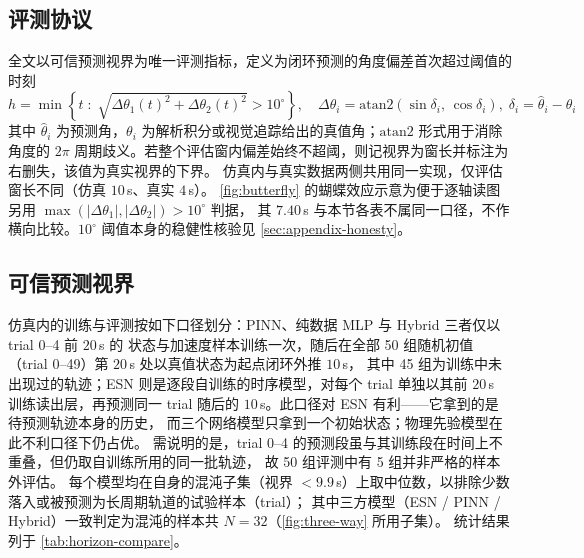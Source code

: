 \documentclass[a4paper,12pt]{ctexart}   %
\newcommand{\thetaone}{\theta_1}
\newcommand{\thetatwo}{\theta_2}
\renewcommand{\emph}[1]{#1}
\begin{document}
\subsection{评测协议}
\label{sec:results-protocol}
全文以\emph{可信预测视界}为唯一评测指标，定义为闭环预测的角度偏差首次超过阈值的时刻
\begin{equation}
h = \min\left\{ t \;:\; \sqrt{\Delta\thetaone(t)^2 + \Delta\thetatwo(t)^2} > 10^\circ \right\},
\quad
\Delta\theta_i = \mathrm{atan2}\!\left(\sin\delta_i,\, \cos\delta_i\right),\;
\delta_i = \hat\theta_i - \theta_i
\label{eq:horizon}
\end{equation}
其中 $\hat\theta_i$ 为预测角，$\theta_i$ 为解析积分或视觉追踪给出的真值角；$\mathrm{atan2}$ 形式用于消除角度的
$2\pi$ 周期歧义。若整个评估窗内偏差始终不超阈，则记视界为窗长并标注为\emph{右删失}，该值为真实视界的下界。
仿真内与真实数据两侧共用同一实现，仅评估窗长不同（仿真 $10$\,s、真实 $4$\,s）。
\cref{fig:butterfly} 的蝴蝶效应示意为便于逐轴读图另用 $\max(|\Delta\thetaone|, |\Delta\thetatwo|) > 10^\circ$ 判据，
其 $7.40$\,s 与本节各表不属同一口径，不作横向比较。$10^\circ$ 阈值本身的稳健性核验见 \cref{sec:appendix-honesty}。

\subsection{可信预测视界}
\label{sec:results-horizon}

仿真内的训练与评测按如下口径划分：PINN、纯数据 MLP 与 Hybrid 三者仅以 trial 0--4 前 $20$\,s 的
状态与加速度样本训练一次，随后在全部 50 组随机初值（trial 0--49）第 $20$\,s 处以真值状态为起点闭环外推 $10$\,s，
其中 45 组为训练中未出现过的轨迹；ESN 则是逐段自训练的时序模型，对每个 trial 单独以其前 $20$\,s
训练读出层，再预测同一 trial 随后的 $10$\,s。此口径对 ESN 有利——它拿到的是待预测轨迹本身的历史，
而三个网络模型只拿到一个初始状态；物理先验模型在此不利口径下仍占优。
需说明的是，trial 0--4 的预测段虽与其训练段在时间上不重叠，但仍取自训练所用的同一批轨迹，
故 50 组评测中有 5 组并非严格的样本外评估。
每个模型均在自身的混沌子集（视界 $< 9.9$\,s）上取中位数，以排除少数落入或被预测为长周期轨道的试验样本（trial）；
其中三方模型（ESN / PINN / Hybrid）一致判定为混沌的样本共 $N = 32$（\cref{fig:three-way} 所用子集）。
统计结果列于 \cref{tab:horizon-compare}。
\end{document}

